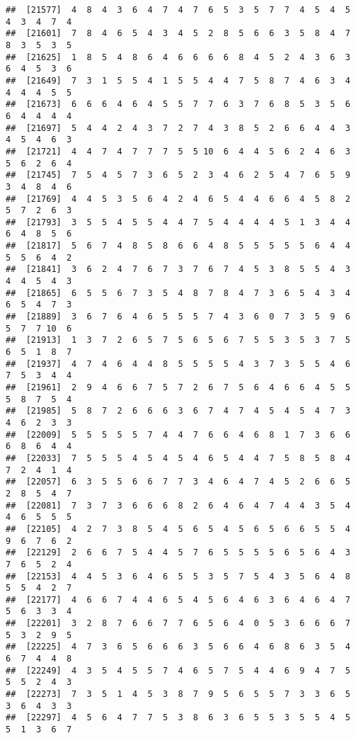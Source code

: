 \documentclass[
]{book}
\begin{document}
\begin{verbatim}
##  [21577]  4  8  4  3  6  4  7  4  7  6  5  3  5  7  7  4  5  4  5  4  3  4  7  4
##  [21601]  7  8  4  6  5  4  3  4  5  2  8  5  6  6  3  5  8  4  7  8  3  5  3  5
##  [21625]  1  8  5  4  8  6  4  6  6  6  6  8  4  5  2  4  3  6  3  6  4  5  3  6
##  [21649]  7  3  1  5  5  4  1  5  5  4  4  7  5  8  7  4  6  3  4  4  4  4  5  5
##  [21673]  6  6  6  4  6  4  5  5  7  7  6  3  7  6  8  5  3  5  6  6  4  4  4  4
##  [21697]  5  4  4  2  4  3  7  2  7  4  3  8  5  2  6  6  4  4  3  4  5  4  6  3
##  [21721]  4  4  7  4  7  7  7  5  5 10  6  4  4  5  6  2  4  6  3  5  6  2  6  4
##  [21745]  7  5  4  5  7  3  6  5  2  3  4  6  2  5  4  7  6  5  9  3  4  8  4  6
##  [21769]  4  4  5  3  5  6  4  2  4  6  5  4  4  6  6  4  5  8  2  5  7  2  6  3
##  [21793]  3  5  5  4  5  5  4  4  7  5  4  4  4  4  5  1  3  4  4  6  4  8  5  6
##  [21817]  5  6  7  4  8  5  8  6  6  4  8  5  5  5  5  5  6  4  4  5  5  6  4  2
##  [21841]  3  6  2  4  7  6  7  3  7  6  7  4  5  3  8  5  5  4  3  4  4  5  4  3
##  [21865]  6  5  5  6  7  3  5  4  8  7  8  4  7  3  6  5  4  3  4  6  5  4  7  3
##  [21889]  3  6  7  6  4  6  5  5  5  7  4  3  6  0  7  3  5  9  6  5  7  7 10  6
##  [21913]  1  3  7  2  6  5  7  5  6  5  6  7  5  5  3  5  3  7  5  6  5  1  8  7
##  [21937]  4  7  4  6  4  4  8  5  5  5  5  4  3  7  3  5  5  4  6  7  5  3  4  4
##  [21961]  2  9  4  6  6  7  5  7  2  6  7  5  6  4  6  6  4  5  5  5  8  7  5  4
##  [21985]  5  8  7  2  6  6  6  3  6  7  4  7  4  5  4  5  4  7  3  4  6  2  3  3
##  [22009]  5  5  5  5  5  7  4  4  7  6  6  4  6  8  1  7  3  6  6  6  8  6  4  4
##  [22033]  7  5  5  5  4  5  4  5  4  6  5  4  4  7  5  8  5  8  4  7  2  4  1  4
##  [22057]  6  3  5  5  6  6  7  7  3  4  6  4  7  4  5  2  6  6  5  2  8  5  4  7
##  [22081]  7  3  7  3  6  6  6  8  2  6  4  6  4  7  4  4  3  5  4  4  6  5  5  5
##  [22105]  4  2  7  3  8  5  4  5  6  5  4  5  6  5  6  6  5  5  4  9  6  7  6  2
##  [22129]  2  6  6  7  5  4  4  5  7  6  5  5  5  5  6  5  6  4  3  7  6  5  2  4
##  [22153]  4  4  5  3  6  4  6  5  5  3  5  7  5  4  3  5  6  4  8  5  5  4  2  7
##  [22177]  4  6  6  7  4  4  6  5  4  5  6  4  6  3  6  4  6  4  7  5  6  3  3  4
##  [22201]  3  2  8  7  6  6  7  7  6  5  6  4  0  5  3  6  6  6  7  5  3  2  9  5
##  [22225]  4  7  3  6  5  6  6  6  3  5  6  6  4  6  8  6  3  5  4  6  7  4  4  8
##  [22249]  4  3  5  4  5  5  7  4  6  5  7  5  4  4  6  9  4  7  5  5  5  2  4  3
##  [22273]  7  3  5  1  4  5  3  8  7  9  5  6  5  5  7  3  3  6  5  3  6  4  3  3
##  [22297]  4  5  6  4  7  7  5  3  8  6  3  6  5  5  3  5  5  4  5  5  1  3  6  7

\end{verbatim}
\end{document}
